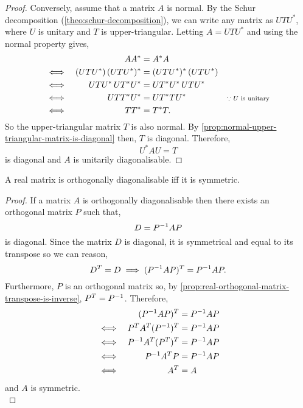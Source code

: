 \documentclass[../MathsNotesBase.tex]{subfiles}
\begin{document}
{\begin{proof}
			Conversely, assume that a matrix $A$ is normal. By the Schur decomposition (\autoref{theo:schur-decomposition}), we can write any matrix as ${ U T U^* }$, where $U$ is unitary and $T$ is upper-triangular. Letting ${ A = U T U^* }$ and using the normal property gives,
			\[\begin{aligned}
				&& A A^* &= A^* A \\
				&\iff & (U T U^*) \, (U T U^*)^* &= (U T U^*)^* \, (U T U^*) &\text{\scriptsize{}} \\
				&\iff & U T U^* \, U T^* U^* &= U T^* U^* \, U T U^* &\text{\scriptsize{}} \\
				&\iff & U T T^* U^* &= U T^* T U^* &\text{\scriptsize{${ \because U \text{ is unitary } }$}} \\
				&\iff & T T^* &= T^* T.
			\end{aligned}\]
			So the upper-triangular matrix $T$ is also normal. By \autoref{prop:normal-upper-triangular-matrix-is-diagonal} then, $T$ is diagonal. Therefore,
			\[ U^* A U = T \]
			is diagonal and $A$ is unitarily diagonalisable.
		\end{proof}
		\begin{corollary}
			A real matrix is orthogonally diagonalisable iff it is symmetric.
		\end{corollary}
		\begin{proof}
			If a matrix $A$ is orthogonally diagonalisable then there exists an orthogonal matrix $P$ such that,
			\[ D = {P}^{-1}AP \]
			is diagonal. Since the matrix $D$ is diagonal, it is symmetrical and equal to its transpose so we can reason,
			\[ D^T = D \implies ({P}^{-1}AP)^T = {P}^{-1}AP. \]
			Furthermore, $P$ is an orthogonal matrix so, by \autoref{prop:real-orthogonal-matrix-transpose-is-inverse}, ${ P^T = {P}^{-1} }$. Therefore,
			\[\begin{aligned}
				&& ({P}^{-1}AP)^T &= {P}^{-1}AP \\
				&\iff & P^T A^T ({P}^{-1})^T &= {P}^{-1}AP \\
				&\iff & {P}^{-1} A^T (P^T)^T &= {P}^{-1}AP \\
				&\iff & {P}^{-1} A^T P &= {P}^{-1}AP \\
				&\iff & A^T &= A
			\end{aligned}\]
			and $A$ is symmetric.\\			
			

\end{proof}}
\end{document}
